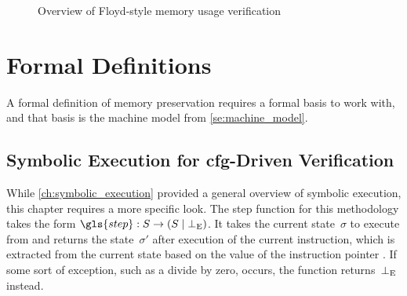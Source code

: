 \begin{figure}
  \centering
  \caption{Overview of Floyd-style memory usage verification}\label{fig:cfg_overview}
\end{figure}

\section{Formal Definitions}\label{se:cfg_defs}
A formal definition of memory preservation requires a formal basis to work with,
and that basis is the machine model from \cref{se:machine_model}.

\subsection{Symbolic Execution for \acs*{cfg}-Driven Verification}\label{cfg_symb_exec}
While \cref{ch:symbolic_execution} provided a general overview of symbolic execution,
this chapter requires a more specific look.
The step function for this methodology takes the form
$\gls{step}:S\rightarrow(S\mid\err)$.%
It takes the current state~$\sigma$ to execute from
and returns the state~$\sigma'$ after execution of the current instruction,
which is extracted from the current state based on the value of the instruction pointer
.
If some sort of exception, such as a divide by zero, occurs,
the function returns~$\bot_\mathrm{E}$ instead.

